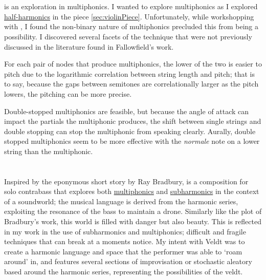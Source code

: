 \section{\celloPiece}\label{sec:celloPiece}

\celloPiece\space is an exploration in multiphonics. 
I wanted to explore multiphonics as I explored \hyperref[sec:half-harmonics]{half-harmonics} in the piece \autoref{sec:violinPiece}.
Unfortunately, while workshopping with \celloParticipant, I found the non-binary nature of multiphonics precluded this from being a possibility.\autocite[]{smithFeedbackCelloSightreading2019}
I discovered several facets of the technique that were not previously discussed in the literature found in Fallowfield's work.\autocite[]{fallowfieldCelloMap}

For each pair of nodes that produce multiphonics, the lower of the two is easier to pitch due to the logarithmic correlation between string length and pitch;
that is to say, because the gaps between semitones are correlationally larger as the pitch lowers, the pitching can be more precise.

Double-stopped multiphonics are feasible, but because the angle of attack can impact the partials the multiphonic produces, the shift between single strings and double stopping can stop the multiphonic from speaking clearly.
Aurally, double stopped multiphonics seem to be more effective with the \emph{normale} note on a lower string than the multiphonic.



\section{\bassPiece}\label{sec:bassPiece}
Inspired by the eponymous short story by Ray Bradbury, \bassPiece\space is a composition for solo contrabass that explores both \hyperref[sec:multiphonicsDiscussion]{multiphonics} and \hyperref[sec:subharmonicsDiscussion]{subharmonics} in the context of a soundworld; the musical language is derived from the harmonic series, exploiting the resonance of the bass to maintain a drone.\autocite[]{bradburyVeldt1951}
Similarly like the plot of Bradbury's work, this world is filled with danger but also beauty. 
This is reflected in my work in the use of subharmonics and multiphonics; difficult and fragile techniques that can break at a moments notice.
My intent with Veldt was to create a harmonic language and space that the performer was able to `roam around' in, and features several sections of improvisation or stochastic aleatory based around the harmonic series, representing the possibilities of the veldt.

